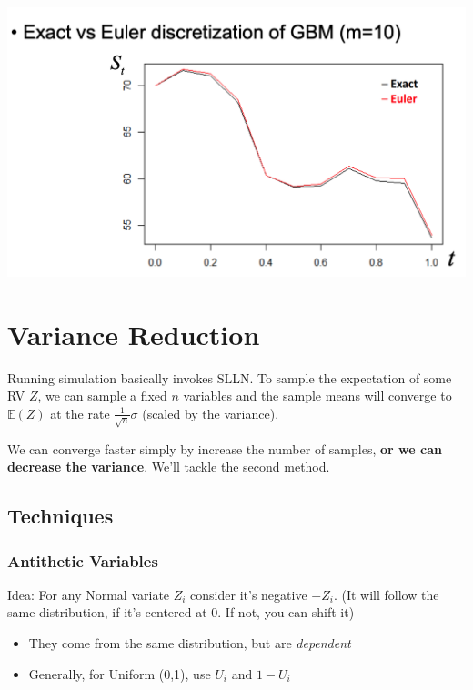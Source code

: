 \documentclass[
  oneside]{book}
\providecommand{\tightlist}{%
  \setlength{\itemsep}{0pt}\setlength{\parskip}{0pt}}
\begin{document}
\includegraphics{Notes/Obsidian-Attachments/11-Pricing-Derivatives-5.png}

\hypertarget{variance-reduction}{%
\chapter{Variance Reduction}\label{variance-reduction}}

Running simulation basically invokes SLLN. To sample the expectation of some RV \(Z\), we can sample a fixed \(n\) variables and the sample means will converge to \(\mathbb{E}(Z)\) at the rate \(\frac{1}{\sqrt{ n }}\sigma\) (scaled by the variance).

We can converge faster simply by increase the number of samples, \textbf{or we can decrease the variance}. We'll tackle the second method.

\hypertarget{techniques}{%
\section{Techniques}\label{techniques}}

\hypertarget{antithetic-variables}{%
\subsection{Antithetic Variables}\label{antithetic-variables}}

Idea: For any Normal variate \(Z_{i}\) consider it's negative \(-Z_{i}\). (It will follow the same distribution, if it's centered at 0. If not, you can shift it)

\begin{itemize}
\tightlist
\item
  They come from the same distribution, but are \emph{dependent}
\item
  Generally, for Uniform (0,1), use \(U_{i}\) and \(1-U_{i}\)
\end{itemize}
\end{document}
